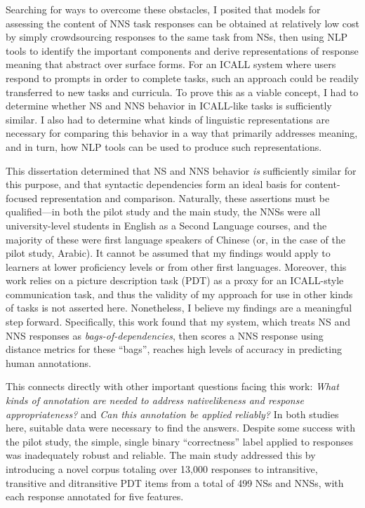Searching for ways to overcome these obstacles, I posited that models for assessing the content of NNS task responses can be obtained at relatively low cost by simply crowdsourcing responses to the same task from NSs, then using NLP tools to identify the important components and derive representations of response meaning that abstract over surface forms. For an ICALL system where users respond to prompts in order to complete tasks, such an approach could be readily transferred to new tasks and curricula. To prove this as a viable concept, I had to determine whether NS and NNS behavior in ICALL-like tasks is sufficiently similar. I also had to determine what kinds of linguistic representations are necessary for comparing this behavior in a way that primarily addresses meaning, and in turn, how NLP tools can be used to produce such representations.

This dissertation determined that NS and NNS behavior \textit{is} sufficiently similar for this purpose, and that syntactic dependencies form an ideal basis for content-focused representation and comparison. Naturally, these assertions must be qualified---in both the pilot study and the main study, the NNSs were all university-level students in English as a Second Language courses, and the majority of these were first language speakers of Chinese (or, in the case of the pilot study, Arabic). It cannot be assumed that my findings would apply to learners at lower proficiency levels or from other first languages. Moreover, this work relies on a picture description task (PDT) as a proxy for an ICALL-style communication task, and thus the validity of my approach for use in other kinds of tasks is not asserted here. Nonetheless, I believe my findings are a meaningful step forward. Specifically, this work found that my system, which treats NS and NNS responses as \textit{bags-of-dependencies}, then scores a NNS response using distance metrics for these ``bags'', reaches high levels of accuracy in predicting human annotations.

This connects directly with other important questions facing this work: \textit{What kinds of annotation are needed to address nativelikeness and response appropriateness?} and \textit{Can this annotation be applied reliably?}
In both studies here, suitable data were necessary to find the answers. Despite some success with the pilot study, the simple, single binary ``correctness'' label applied to responses was inadequately robust and reliable. The main study addressed this by introducing a novel corpus totaling over 13,000 responses to intransitive, transitive and ditransitive PDT items from a total of 499 NSs and NNSs, with each response annotated for five features.


